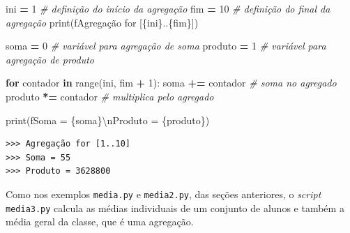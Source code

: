 \documentclass[
]{book}
\newenvironment{Shaded}{\begin{snugshade}}{\end{snugshade}}
\newcommand{\BuiltInTok}[1]{#1}
\newcommand{\CharTok}[1]{\textcolor[rgb]{0.31,0.60,0.02}{#1}}
\newcommand{\CommentTok}[1]{\textcolor[rgb]{0.56,0.35,0.01}{\textit{#1}}}
\newcommand{\ControlFlowTok}[1]{\textcolor[rgb]{0.13,0.29,0.53}{\textbf{#1}}}
\newcommand{\DecValTok}[1]{\textcolor[rgb]{0.00,0.00,0.81}{#1}}
\newcommand{\KeywordTok}[1]{\textcolor[rgb]{0.13,0.29,0.53}{\textbf{#1}}}
\newcommand{\NormalTok}[1]{#1}
\newcommand{\OperatorTok}[1]{\textcolor[rgb]{0.81,0.36,0.00}{\textbf{#1}}}
\newcommand{\SpecialCharTok}[1]{\textcolor[rgb]{0.00,0.00,0.00}{#1}}
\newcommand{\SpecialStringTok}[1]{\textcolor[rgb]{0.31,0.60,0.02}{#1}}
\begin{document}
\begin{Shaded}
\begin{Highlighting}[]
\NormalTok{ini }\OperatorTok{=} \DecValTok{1} \CommentTok{\# definição do início da agregação}
\NormalTok{fim }\OperatorTok{=} \DecValTok{10} \CommentTok{\# definição do final da agregação}
\BuiltInTok{print}\NormalTok{(}\SpecialStringTok{f\textquotesingle{}Agregação for [}\SpecialCharTok{\{}\NormalTok{ini}\SpecialCharTok{\}}\SpecialStringTok{..}\SpecialCharTok{\{}\NormalTok{fim}\SpecialCharTok{\}}\SpecialStringTok{]\textquotesingle{}}\NormalTok{)}

\NormalTok{soma }\OperatorTok{=} \DecValTok{0} \CommentTok{\# variável para agregação de soma}
\NormalTok{produto }\OperatorTok{=} \DecValTok{1} \CommentTok{\# variável para agregação de produto}

\ControlFlowTok{for}\NormalTok{ contador }\KeywordTok{in} \BuiltInTok{range}\NormalTok{(ini, fim }\OperatorTok{+} \DecValTok{1}\NormalTok{):}
\NormalTok{    soma }\OperatorTok{+=}\NormalTok{ contador }\CommentTok{\# soma no agregado}
\NormalTok{    produto }\OperatorTok{*=}\NormalTok{ contador }\CommentTok{\# multiplica pelo agregado}

\BuiltInTok{print}\NormalTok{(}\SpecialStringTok{f\textquotesingle{}Soma = }\SpecialCharTok{\{}\NormalTok{soma}\SpecialCharTok{\}}\CharTok{\textbackslash{}n}\SpecialStringTok{Produto = }\SpecialCharTok{\{}\NormalTok{produto}\SpecialCharTok{\}}\SpecialStringTok{\textquotesingle{}}\NormalTok{)}
\end{Highlighting}
\end{Shaded}

\begin{verbatim}
>>> Agregação for [1..10]
>>> Soma = 55
>>> Produto = 3628800
\end{verbatim}

Como nos exemplos \texttt{media.py} e \texttt{media2.py}, das seções anteriores, o \emph{script} \texttt{media3.py} calcula as médias individuais de um conjunto de alunos e também a média geral da classe, que é uma agregação.
\end{document}
